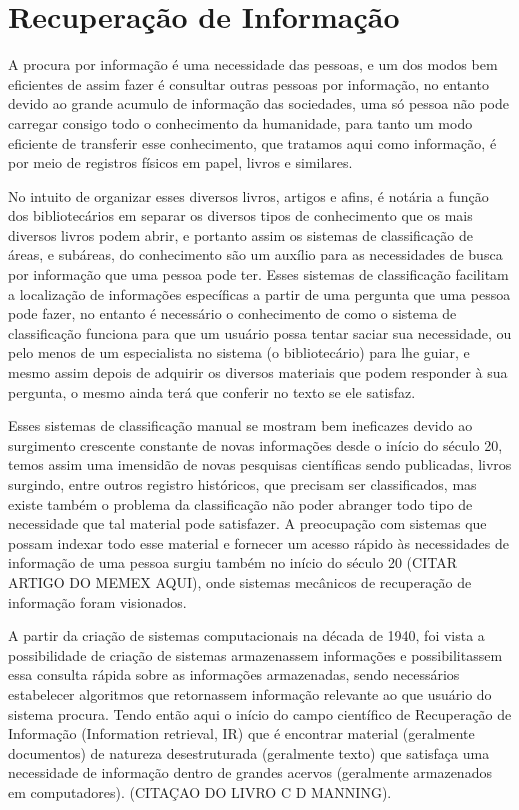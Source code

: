\section{Recuperação de Informação} \label{sec:RecuperaçãoInformação}

A procura por informação é uma necessidade das pessoas, e um dos modos bem eficientes de assim fazer é consultar outras pessoas por informação, no entanto devido ao grande acumulo de informação das sociedades, uma só pessoa não pode carregar consigo todo o conhecimento da humanidade, para tanto um modo eficiente de transferir esse conhecimento, que tratamos aqui como informação, é por meio de registros físicos em papel, livros e similares.

No intuito de organizar esses diversos livros, artigos e afins, é notária a função dos bibliotecários em separar os diversos tipos de conhecimento que os mais diversos livros podem abrir, e portanto assim os sistemas de classificação de áreas, e subáreas, do conhecimento são um auxílio para as necessidades de busca por informação que uma pessoa pode ter. Esses sistemas de classificação facilitam a localização de informações específicas a partir de uma pergunta que uma pessoa pode fazer, no entanto é necessário o conhecimento de como o sistema de classificação funciona para que um usuário possa tentar saciar sua necessidade, ou pelo menos de um especialista no sistema (o bibliotecário) para lhe guiar, e mesmo assim depois de adquirir os diversos materiais que podem responder à sua pergunta, o mesmo ainda terá que conferir no texto se ele satisfaz.

Esses sistemas de classificação manual se mostram bem ineficazes devido ao surgimento crescente constante de novas informações desde o início do século 20, temos assim uma imensidão de novas pesquisas científicas sendo publicadas, livros surgindo, entre outros registro históricos, que precisam ser classificados, mas existe também o problema da classificação não poder abranger todo tipo de necessidade que tal material pode satisfazer. A preocupação com sistemas que possam indexar todo esse material e fornecer um acesso rápido às necessidades de informação de uma pessoa surgiu também no início do século 20 (CITAR ARTIGO DO MEMEX AQUI), onde sistemas mecânicos de recuperação de informação foram visionados.

A partir da criação de sistemas computacionais na década de 1940, foi vista a possibilidade de criação de sistemas armazenassem informações e possibilitassem essa consulta rápida sobre as informações armazenadas, sendo necessários estabelecer algoritmos que retornassem informação relevante ao que usuário do sistema procura. Tendo então aqui o início do campo científico de Recuperação de Informação (Information retrieval, IR) que é encontrar material (geralmente documentos) de natureza desestruturada (geralmente texto) que satisfaça uma necessidade de informação dentro de grandes acervos (geralmente armazenados em computadores). (CITAÇAO DO LIVRO C D MANNING).